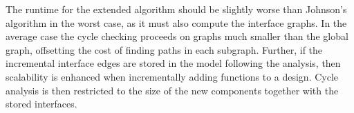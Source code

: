The runtime for the extended algorithm should be slightly worse than Johnson's 
algorithm in the worst case, as it must also compute the interface graphs.  
In the average case the cycle checking proceeds on graphs much smaller than
the global graph, offsetting the cost of finding paths in each subgraph.
Further, if the incremental interface edges are stored in the model following
the analysis, then scalability is enhanced when incrementally adding functions to a design.  Cycle analysis is then restricted to the size of the new components together with the stored interfaces.
